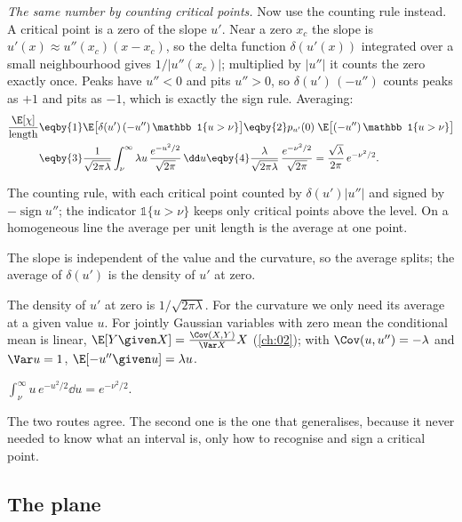 \emph{The same number by counting critical points.} Now use the counting rule instead. A critical point is a
zero of the slope $u'$. Near a zero $x_c$ the slope is $u'(x)\approx u''(x_c)(x-x_c)$, so the delta function
$\delta(u'(x))$ integrated over a small neighbourhood gives $1/|u''(x_c)|$; multiplied by $|u''|$ it counts
the zero exactly once. Peaks have $u''<0$ and pits $u''>0$, so $\delta(u')\,(-u'')$ counts peaks as $+1$ and
pits as $-1$, which is exactly the sign rule. Averaging:
\begin{align}
  \frac{\E[\chi]}{\text{length}}
  &\eqby{1}\E\big[\delta(u')\,(-u'')\,\mathbb 1\{u>\nu\}\big]
   \eqby{2}p_{u'}(0)\;\E\big[(-u'')\,\mathbb 1\{u>\nu\}\big]\nonumber\\
  &\eqby{3}\frac{1}{\sqrt{2\pi\lambda}}\int_\nu^\infty\lambda u\,\frac{e^{-u^2/2}}{\sqrt{2\pi}}\,\dd u
   \eqby{4}\frac{\lambda}{\sqrt{2\pi\lambda}}\,\frac{e^{-\nu^2/2}}{\sqrt{2\pi}}
   =\frac{\sqrt\lambda}{2\pi}\,e^{-\nu^2/2}.
  \label{12a:eq:kr1}
\end{align}
\begin{explain}
  \item The counting rule, with each critical point counted by $\delta(u')|u''|$ and signed by
        $-\operatorname{sign}u''$; the indicator $\mathbb 1\{u>\nu\}$ keeps only critical points above the
        level. On a homogeneous line the average per unit length is the average at one point.
  \item The slope is independent of the value and the curvature, so the average splits; the average of
        $\delta(u')$ is the density of $u'$ at zero.
  \item The density of $u'$ at zero is $1/\sqrt{2\pi\lambda}$. For the curvature we only need its average at a
        given value $u$. For jointly Gaussian variables with zero mean the conditional mean is linear,
        $\E[Y\given X]=\frac{\Cov(X,Y)}{\Var X}X$ (\cref{ch:02}); with $\Cov(u,u'')=-\lambda$ and $\Var u=1$,
        $\E[-u''\given u]=\lambda u$.
  \item $\int_\nu^\infty u\,e^{-u^2/2}\dd u=e^{-\nu^2/2}$.
\end{explain}
The two routes agree. The second one is the one that generalises, because it never needed to know what an
interval is, only how to recognise and sign a critical point.

\subsection{The plane}
\label{12a:sec:gkf2}

